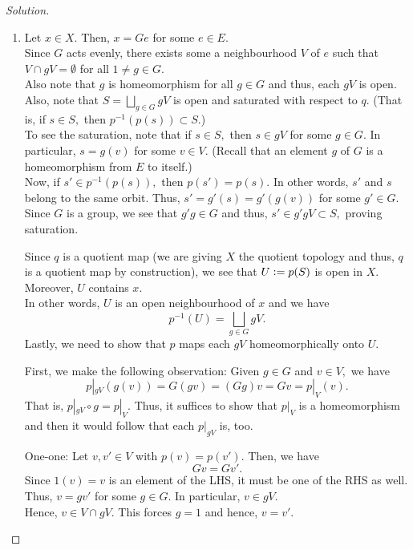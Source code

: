\documentclass[12pt]{article}
\newenvironment{soln}{\begin{proof}[Solution]}{\end{proof}}
\begin{document}
\begin{soln}
	\phantom{hi}
	\begin{enumerate}
		\item Let $x \in X.$ Then, $x = Ge$ for some $e \in E.$\\
		Since $G$ acts evenly, there exists some a neighbourhood $V$ of $e$ such that $V \cap gV = \emptyset$ for all $1 \neq g \in G.$\\
		Also note that $g$ is homeomorphism for all $g \in G$ and thus, each $gV$ is open.\\
		Also, note that $S = \displaystyle\bigsqcup_{g \in G}gV$ is open and saturated with respect to $q.$ (That is, if $s \in S,$ then $p^{-1}(p(s)) \subset S.$)\\
		To see the saturation, note that if $s \in S,$ then $s \in gV$ for some $g \in G.$ In particular, $s = g(v)$ for some $v \in V.$ (Recall that an element $g$ of $G$ is a homeomorphism from $E$ to itself.)\\
		Now, if $s' \in p^{-1}(p(s)),$ then $p(s') = p(s).$ In other words, $s'$ and $s$ belong to the same orbit. Thus, $s' = g'(s) = g'(g(v))$ for some $g' \in G.$\\
		Since $G$ is a group, we see that $g'g \in G$ and thus, $s' \in g'gV \subset S,$ proving saturation.

		Since $q$ is a quotient map (we are giving $X$ the quotient topology and thus, $q$ is a quotient map by construction), we see that $U \vcentcolon= p(S)$ is open in $X.$ Moreover, $U$ contains $x.$\\
		In other words, $U$ is an open neighbourhood of $x$ and we have
		\begin{equation*} 
			p^{-1}(U) = \bigsqcup_{g \in G} gV.
		\end{equation*}
		Lastly, we need to show that $p$ maps each $gV$ homeomorphically onto $U.$

		First, we make the following observation: Given $g \in G$ and $v \in V,$ we have
		\begin{equation*} 
			p|_{gV}(g(v)) = G(gv) = (Gg)v = Gv = p|_V(v).	
		\end{equation*}
		That is, $p|_{gV}\circ g = p|_V.$ Thus, it suffices to show that $p|_V$ is a homeomorphism and then it would follow that each $p|_{gV}$ is, too.

		One-one: Let $v, v' \in V$ with $p(v) = p(v').$ Then, we have
		\begin{equation*} 
			Gv = Gv'.
		\end{equation*}
		Since $1(v) = v$ is an element of the LHS, it must be one of the RHS as well. Thus, $v = gv'$ for some $g \in G.$ In particular, $v \in gV.$\\
		Hence, $v \in V \cap gV.$ This forces $g = 1$ and hence, $v = v'.$


\end{enumerate}
\end{soln}
\end{document}
